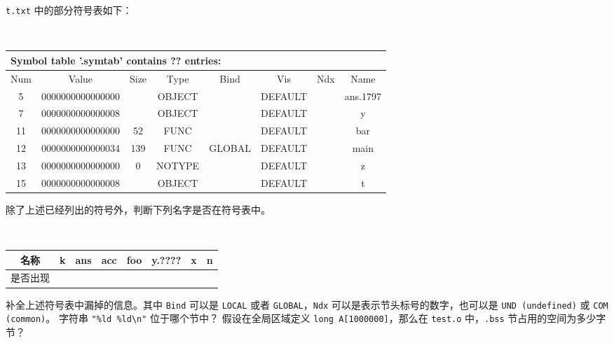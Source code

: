 \begin{problems}
        \verb|t.txt| 中的部分符号表如下：
        \begin{table}[H]
            \tt
            \centering
            \begin{tabular}{cccccccc}
                \multicolumn{8}{l}{Symbol table '.symtab' contains ?? entries:} \\ \hline
                \multicolumn{1}{|c}{Num} & Value & Size & Type & Bind & Vis & Ndx & \multicolumn{1}{c|}{Name} \\
                \multicolumn{1}{|c}{5} & 0000000000000000 &  & OBJECT &  & DEFAULT &  & \multicolumn{1}{c|}{ans.1797} \\
                \multicolumn{1}{|c}{7} & 0000000000000008 &  & OBJECT &  & DEFAULT &  & \multicolumn{1}{c|}{y} \\
                \multicolumn{1}{|c}{11} & 0000000000000000 & 52 & FUNC &  & DEFAULT &  & \multicolumn{1}{c|}{bar} \\
                \multicolumn{1}{|c}{12} & 0000000000000034 & 139 & FUNC & GLOBAL & DEFAULT &  & \multicolumn{1}{c|}{main} \\
                \multicolumn{1}{|c}{13} & 0000000000000000 & 0 & NOTYPE &  & DEFAULT &  & \multicolumn{1}{c|}{z} \\
                \multicolumn{1}{|c}{15} & 0000000000000008 &  & OBJECT &  & DEFAULT &  & \multicolumn{1}{c|}{t} \\ \hline
            \end{tabular}
        \end{table}
        \qn 除了上述已经列出的符号外，判断下列名字是否在符号表中。
        \begin{table}[H]
            \tt
            \centering
            \begin{tabular}{|c|c|c|c|c|c|c|c|}
                \hline
                名称 & k & ans & acc & foo & y.???? & x & n \\ \hline
                是否出现 & {\qquad \qquad} & {\qquad \qquad} & {\qquad \qquad} & {\qquad \qquad} & {\qquad \qquad} & {\qquad \qquad} & {\qquad \qquad} \\ \hline
            \end{tabular}
        \end{table}
        \qn 补全上述符号表中漏掉的信息。其中 \verb|Bind| 可以是 \verb|LOCAL| 或者 \verb|GLOBAL|，\verb|Ndx| 可以是表示节头标号的数字，也可以是 \verb|UND (undefined)| 或 \verb|COM (common)|。
        \qn 字符串 \verb|"%ld %ld\n"| 位于哪个节中？
        \qn 假设在全局区域定义 \verb|long A[1000000]|，那么在 \verb|test.o| 中，\verb|.bss| 节占用的空间为多少字节？

\end{problems}
